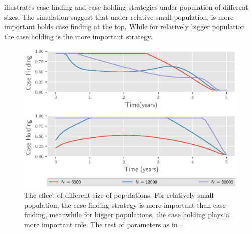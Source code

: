  illustrates case finding and case holding 
strategies under population of different sizes. The simulation suggest that
under relative small population, is more important holds case finding at the 
top. While for relatively bigger population the case holding is the more 
important strategy.
\begin{figure}
  \centering
  \includegraphics{Figures/figure_3_two_strain_tbm}
  \caption{
    The effect of different size of populations. For 
    relatively small population, the case finding strategy is more important 
    than case finding, meanwhile for  bigger populations, the case holding 
    plays a more important role. The rest of parameters as in 
    .
  }
  \label{fig:figure3twostraintbm}
\end{figure}
